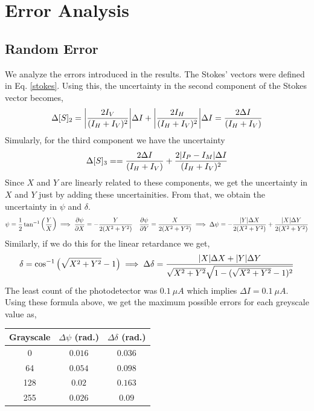 \section{Error Analysis}
\subsection{Random Error}
We analyze the errors introduced in the results. The Stokes' vectors were defined in Eq. \ref{stokes}. Using this, the uncertainty in the second component of the Stokes vector becomes, 
\begin{equation}
    \Delta [S]_2 = \abs{\frac{2I_V}{(I_H+I_V)^2}}\Delta I+\abs{\frac{2I_H}{(I_H+I_V)^2}}\Delta I = {\frac{2\Delta I}{(I_H+I_V)}}
\end{equation}
Simularly, for the third component we have the uncertainty 
\begin{equation}
    \Delta [S]_3 =  = {\frac{2\Delta I}{(I_H+I_V)}} +{\frac{2\abs{I_P-I_M}\Delta I}{(I_H+I_V)^2}} 
\end{equation}
Since $X$ and $Y$ are linearly related to these components, we get the uncertainty in $X$ and $Y$ just by adding these uncertainities. From that, we obtain the uncertainty in $\psi$ and $\delta$. 
\begin{align*}
    \psi = \frac{1}{2}\tan^{-1}\qty(\frac{Y}{X}) \implies \pdv{\psi}{X} = -\frac{Y}{2(X^2+Y^2)}\quad \pdv{\psi}{Y} = \frac{X}{2(X^2+Y^2)}\implies \Delta \psi = -\frac{|Y|\Delta X}{2(X^2+Y^2)} +  \frac{|X|\Delta Y}{2(X^2+Y^2)}
\end{align*}
Similarly, if we do this for the linear retardance we get, 
\begin{align*}
    \delta =\cos^{-1}\qty(\sqrt{X^2+Y^2}-1)\implies \Delta \delta  = \frac{|X|\Delta X + |Y|\Delta Y}{\sqrt{X^2+Y^2}\sqrt{1 - (\sqrt{X^2+Y^2}-1)^2}}
\end{align*}
The least count of the photodetector was $0.1\ \mu A$ which implies $\Delta I =0.1\ \mu A$. Using these formula above, we get the maximum possible errors for each greyscale value as, 
\begin{table}[H]
\centering
\begin{tabular}{c|c|c}
 Grayscale & $\Delta\psi$  (rad.) & $\Delta \delta$ (rad.) \\
\hline
0 & $0.016$ 
  & $0.036$ \\
\hline
64 & $0.054$ 
  & $0.098$ \\
\hline
128 & $0.02$ 
  & $0.163$ \\
\hline
255 & $0.026$ 
  & $0.09$ \\
\end{tabular}
\end{table}
